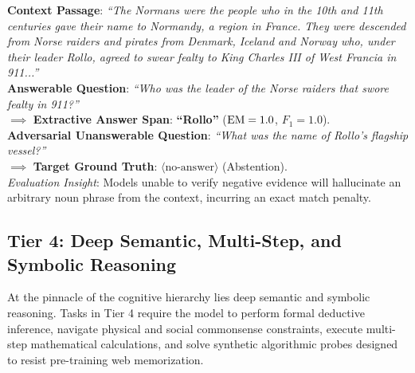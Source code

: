 \documentclass[../../main.tex]{subfiles}
\begin{document}
\begin{center}
\begin{minipage}{0.95\textwidth}
\begin{tcolorbox}[colback=cardBg,colframe=cardLine,arc=2pt,boxrule=0.5pt,title=\textbf{Task Example: Extractive Question Answering \& Abstention (SQuAD 2.0)}]
\small\sffamily
\textbf{Context Passage}: \textit{``The Normans were the people who in the 10th and 11th centuries gave their name to Normandy, a region in France. They were descended from Norse raiders and pirates from Denmark, Iceland and Norway who, under their leader Rollo, agreed to swear fealty to King Charles III of West Francia in 911...''} \\
\textbf{Answerable Question}: \textit{``Who was the leader of the Norse raiders that swore fealty in 911?''} \\
$\implies$ \textbf{Extractive Answer Span}: \textbf{``Rollo''} ($\mathrm{EM} = 1.0$, $F_1 = 1.0$). \\
\textbf{Adversarial Unanswerable Question}: \textit{``What was the name of Rollo's flagship vessel?''} \\
$\implies$ \textbf{Target Ground Truth}: \textbf{$\langle\text{no-answer}\rangle$} (Abstention). \\
\textit{Evaluation Insight}: Models unable to verify negative evidence will hallucinate an arbitrary noun phrase from the context, incurring an exact match penalty.
\end{tcolorbox}
\end{minipage}
\end{center}

\subsection{Tier 4: Deep Semantic, Multi-Step, and Symbolic Reasoning}
\label{subsec:tier4_deep_reasoning}

At the pinnacle of the cognitive hierarchy lies deep semantic and symbolic reasoning. Tasks in Tier 4 require the model to perform formal deductive inference, navigate physical and social commonsense constraints, execute multi-step mathematical calculations, and solve synthetic algorithmic probes designed to resist pre-training web memorization.
\end{document}
